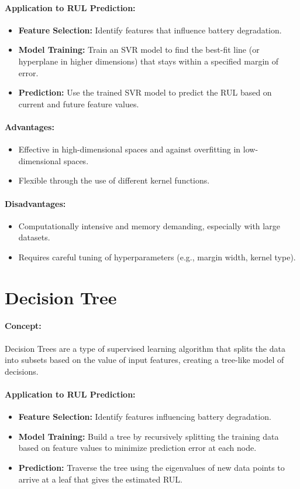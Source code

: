 \paragraph{Application to RUL Prediction:}
\begin{itemize}
    \item \textbf{Feature Selection:} Identify features that influence battery degradation.
    \item \textbf{Model Training:} Train an SVR model to find the best-fit line (or hyperplane in higher dimensions) that stays within a specified margin of error.
    \item \textbf{Prediction:} Use the trained SVR model to predict the RUL based on current and future feature values.
\end{itemize}
\paragraph{Advantages:}
\begin{itemize}
    \item Effective in high-dimensional spaces and against overfitting in low-dimensional spaces.
    \item Flexible through the use of different kernel functions.
\end{itemize}
\paragraph{Disadvantages:}
\begin{itemize}
    \item Computationally intensive and memory demanding, especially with large datasets.
    \item Requires careful tuning of hyperparameters (e.g., margin width, kernel type).
\end{itemize}

\section{Decision Tree}
\paragraph{Concept:}
Decision Trees are a type of supervised learning algorithm that splits the data into subsets based on the value of input features, creating a tree-like model of decisions.
\paragraph{Application to RUL Prediction:}
\begin{itemize}
    \item \textbf{Feature Selection:} Identify features influencing battery degradation.
    \item \textbf{Model Training:} Build a tree by recursively splitting the training data based on feature values to minimize prediction error at each node.
    \item \textbf{Prediction:} Traverse the tree using the eigenvalues of new data points to arrive at a leaf that gives the estimated RUL.
\end{itemize}
